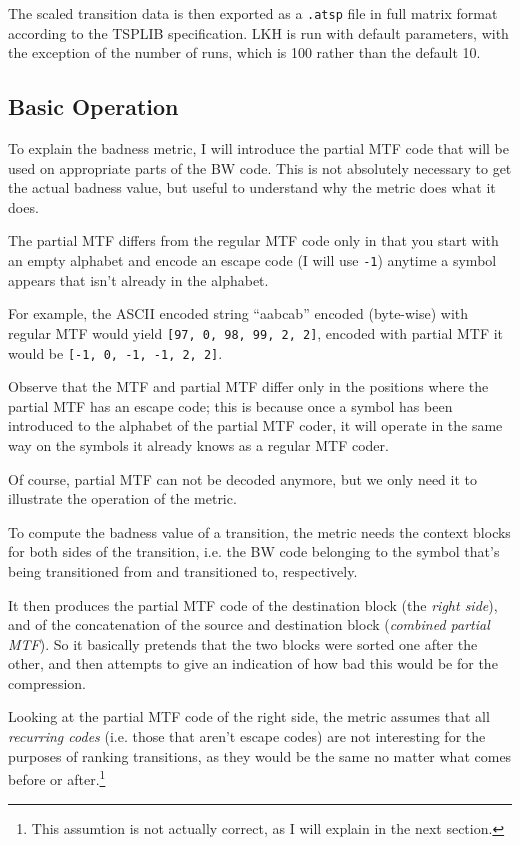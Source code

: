 \documentclass[a4paper]{scrreprt}
\begin{document}
The scaled transition data is then exported as a \texttt{.atsp} file in full
matrix format according to the TSPLIB specification\cite{reinelt1991tsplib}. LKH
is run with default parameters, with the exception of the number of runs, which
is 100 rather than the default 10.

\subsection{Basic Operation}

To explain the badness metric, I will introduce the partial MTF code that will
be used on appropriate parts of the BW code. This is not absolutely necessary to
get the actual badness value, but useful to understand why the metric does what
it does.

The partial MTF differs from the regular MTF code only in that you start with an
empty alphabet and encode an escape code (I will use \texttt{-1}) anytime a
symbol appears that isn't already in the alphabet.

For example, the ASCII encoded string ``aabcab'' encoded (byte-wise) with
regular MTF would yield \texttt{[97, 0, 98, 99, 2, 2]}, encoded with partial MTF
it would be \texttt{[-1, 0, -1, -1, 2, 2]}.

Observe that the MTF and partial MTF differ only in the positions where the
partial MTF has an escape code; this is because once a symbol has been
introduced to the alphabet of the partial MTF coder, it will operate in the same
way on the symbols it already knows as a regular MTF coder.

Of course, partial MTF can not be decoded anymore, but we only need it to
illustrate the operation of the metric.

To compute the badness value of a transition, the metric needs the context
blocks for both sides of the transition, i.e. the BW code belonging to the
symbol that's being transitioned from and transitioned to, respectively.

It then produces the partial MTF code of the destination block (the \emph{right
side}), and of the concatenation of the source and destination block
(\emph{combined partial MTF}). So it  basically pretends that the two blocks
were sorted one after the other, and then attempts to give an indication of how
bad this would be for the compression.

Looking at the partial MTF code of the right side, the metric assumes that all
\emph{recurring codes} (i.e. those that aren't escape codes) are not interesting
for the purposes of ranking transitions, as they would be the same no matter
what comes before or after.\footnote{This assumtion is not actually correct, as
I will explain in the next section.}
\end{document}
